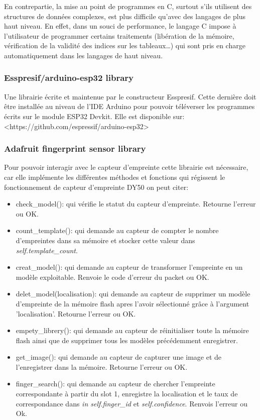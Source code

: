 En contrepartie, la mise au point de programmes en C, surtout s’ils utilisent 
des structures de données complexes, est plus difficile qu’avec des langages de 
plus haut niveau. En effet, dans un souci de performance, le langage C impose à 
l’utilisateur de programmer certains traitements (libération de la mémoire, 
vérification de la validité des indices sur les tableaux…) qui sont pris en 
charge automatiquement dans les langages de haut niveau\cite{35}.

\subsubsection{Esspresif/arduino-esp32 library}
Une librairie écrite et maintenue par le constructeur Esspresif. Cette dernière 
doit être installée au niveau de l'IDE Arduino pour pouvoir téléverser les 
programmes écrits sur le module ESP32 Devkit. Elle est disponible sur: 
<https://github.com/espressif/arduino-esp32>

\subsubsection{Adafruit fingerprint sensor library}
Pour pouvoir interagir avec le capteur d'empreinte cette librairie est 
nécessaire, car elle implémente les différentes méthodes et fonctions qui 
régissent le fonctionnement de capteur d'empreinte DY50 on peut citer:

\begin{itemize}
    \item[\textbullet] check\_model(): qui vérifie le statut du capteur
        d'empreinte. Retourne l'erreur ou OK.
    \item[\textbullet] count\_template(): qui demande au capteur de compter le
        nombre d'empreintes dans sa mémoire et stocker cette valeur dans
        \emph{self.template\_count}.
    \item[\textbullet] creat\_model(): qui demande au capteur de transformer
        l'empreinte en un modèle exploitable. Renvoie le code d'erreur du packet
        ou OK.
    \item[\textbullet] delet\_model(localisation): qui demande au capteur de
        supprimer un modèle d'empreinte de la mémoire flash apres l'avoir
        sélectionné grâce à l'argument 'localisation'. Retourne l'erreur ou OK.
    \item[\textbullet] empety\_librery(): qui demande au capteur de
        réinitialiser toute la mémoire flash ainsi que de supprimer tous les
        modèles précédemment enregistrer. 
    \item[\textbullet] get\_image(): qui demande au capteur de capturer une
        image et de l'enregistrer dans la mémoire. Retourne l'erreur ou OK. 
    \item[\textbullet] finger\_search(): qui demande au capteur de chercher
        l'empreinte correspondante à partir du slot 1, enregistre la
        localisation et le taux de correspondance dans \emph{in self.finger\_id}
        et \emph{self.confidence}. Renvois l'erreur ou Ok.\cite{36}
\end{itemize}

